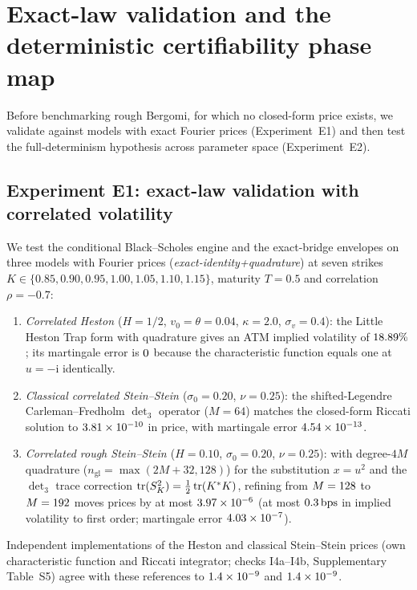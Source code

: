 \section{Exact-law validation and the deterministic certifiability phase map}
\label{sec:exact_phase}

Before benchmarking rough Bergomi, for which no closed-form price exists, we validate \RoughCertSPX{} against models with exact Fourier prices (Experiment~E1) and then test the full-determinism hypothesis across parameter space (Experiment~E2).

\subsection{Experiment E1: exact-law validation with correlated volatility}
\label{sec:e1}

We test the conditional Black--Scholes engine and the exact-bridge envelopes on three models with Fourier prices (\emph{exact-identity+quadrature}) at seven strikes $K\in\{0.85,\allowbreak 0.90,\allowbreak 0.95,\allowbreak 1.00,\allowbreak 1.05,\allowbreak 1.10,\allowbreak 1.15\}$, maturity $T=0.5$ and correlation $\rho=-0.7$:
\begin{enumerate}[1.]
  \item \emph{Correlated Heston \citep{Heston1993}} ($H=1/2$, $v_0=\theta=0.04$, $\kappa=2.0$, $\sigma_v=0.4$): the Little Heston Trap form \citep{AlbrecherMayerSchoutensTistaert2007} with \citet{Lewis2001} quadrature gives an ATM implied volatility of $18.89\%$; its martingale error is $0$ because the characteristic function equals one at $u=-\mathrm{i}$ identically.
  \item \emph{Classical correlated Stein--Stein \citep{SteinStein1991}} ($\sigma_0=0.20$, $\nu=0.25$): the shifted-Legendre Carleman--Fredholm $\det_3$ operator ($M=64$) matches the closed-form Riccati solution to $3.81\times 10^{-10}$ in price, with martingale error $4.54\times 10^{-13}$.
  \item \emph{Correlated rough Stein--Stein \citep{AbiJaber2022}} ($H=0.10$, $\sigma_0=0.20$, $\nu=0.25$): with degree-$4M$ quadrature ($n_{\mathrm{gl}}=\max(2M+32,128)$) for the substitution $x=u^2$ and the $\det_3$ trace correction $\operatorname{tr}(S_K^2)=\tfrac12\operatorname{tr}(K^*K)$, refining from $M=128$ to $M=192$ moves prices by at most $3.97\times 10^{-6}$ (at most $0.3\,\mathrm{bps}$ in implied volatility to first order; martingale error $4.03\times 10^{-7}$).
\end{enumerate}
Independent implementations of the Heston and classical Stein--Stein prices (own characteristic function and Riccati integrator; checks I4a--I4b, Supplementary Table~S5) agree with these references to $1.4\times 10^{-9}$ and $1.4\times 10^{-9}$.

